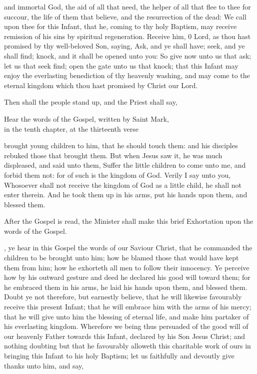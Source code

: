  and immortal God, the aid of all that need, the helper of all that flee to thee for succour, the life of them that believe, and the resurrection of the dead: We call upon thee for this Infant, that he, coming to thy holy Baptism, may receive remission of his sins by spiritual regeneration. Receive him, 0 Lord, as thou hast promised by thy well-beloved Son, saying, Ask, and ye shall have; seek, and ye shall find; knock, and it shall be opened unto you: So give now unto us that ask; let us that seek find; open the gate unto us that knock; that this Infant may enjoy the everlasting benediction of thy heavenly washing, and may come to the eternal kingdom which thou hast promised by Christ our Lord.

\begin{rubric}
Then shall the people stand up, and the Priest shall say,
\end{rubric}

\begin{center}
Hear the words of the Gospel, written by Saint Mark,\\
in the tenth chapter, at the thirteenth verse
\end{center}

 brought young children to him, that he should touch them: and his disciples rebuked those that brought them.
But when Jesus saw it, he was much displeased, and said unto them, Suffer the little children to come unto me, and forbid them not: for of such is the kingdom of God.
Verily I say unto you, Whosoever shall not receive the kingdom of God as a little child, he shall not enter therein.
And he took them up in his arms, put his hands upon them, and blessed them.

\begin{rubric}
After the Gospel is read, the Minister shall make this brief Exhortation upon the words of the Gospel.
\end{rubric}

, ye hear in this Gospel the words of our Saviour Christ, that he commanded the children to be brought unto him; how he blamed those that would have kept them from him; how he exhorteth all men to follow their innocency. Ye perceive how by his outward gesture and deed he declared his good will toward them; for he embraced them in his arms, he laid his hands upon them, and blessed them. Doubt ye not therefore, but earnestly believe, that he will likewise favourably receive this present Infant; that he will embrace him with the arms of his mercy; that he will give unto him the blessing of eternal life, and make him partaker of his everlasting kingdom. Wherefore we being thus persuaded of the good will of our heavenly Father towards this Infant, declared by his Son Jesus Christ; and nothing doubting but that he favourably alloweth this charitable work of ours in bringing this Infant to his holy Baptism; let us faithfully and devoutly give thanks unto him, and say,


